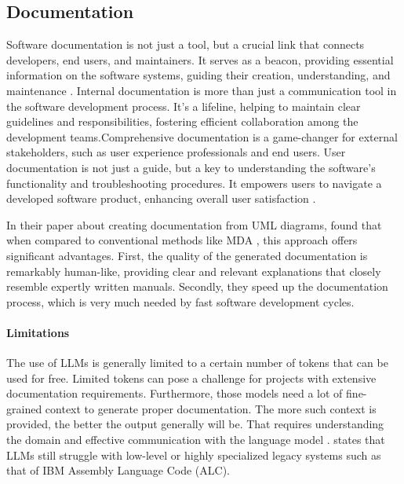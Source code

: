 \subsection{Documentation}
Software documentation \cite{naimi2024automate_4} is not just a tool, but a crucial link that connects developers, end users, and maintainers. It serves as a beacon, providing essential information on the software systems, guiding their creation, understanding, and maintenance \cite{naimi2024automate_5}. Internal documentation \cite{naimi2024automate_6} is more than just a communication tool in the software development process. It's a lifeline, helping to maintain clear guidelines and responsibilities, fostering efficient collaboration among the development teams.Comprehensive documentation is a game-changer for external stakeholders, such as user experience professionals and end users. User documentation is not just a guide, but a key to understanding the software's functionality and troubleshooting procedures. It empowers users to navigate a developed software product, enhancing overall user satisfaction \cite{naimi2024automate_7}.

In their paper about creating documentation from UML diagrams, \citet{naimi2024automate} found that when compared to conventional methods like MDA \cite{naimi2024automate_mda}, this approach offers significant advantages. First, the quality of the generated documentation is remarkably human-like, providing clear and relevant explanations that closely resemble expertly written manuals. Secondly, they speed up the documentation process, which is very much needed by fast software development cycles.

\paragraph{Limitations}
The use of LLMs is generally limited to a certain number of tokens that can be used for free. Limited tokens can pose a challenge for projects with extensive documentation requirements. Furthermore, those models need a lot of fine-grained context to generate proper documentation. The more such context is provided, the better the output generally will be. That requires understanding the domain and effective communication with the language model \cite{naimi2024automate}. \citet{diggs2024leveragingllmslegacycode} states that LLMs still struggle with low-level or highly specialized legacy systems such as that of IBM Assembly Language Code (ALC).